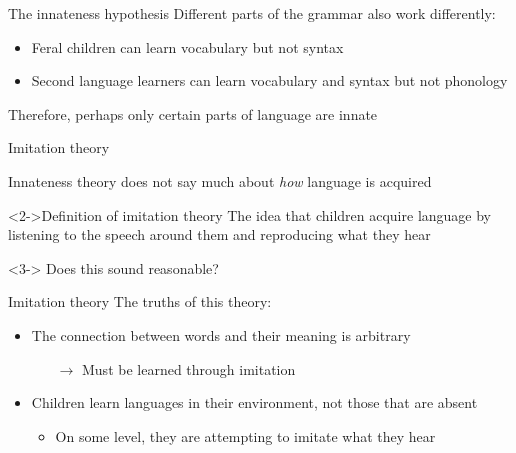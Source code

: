 \documentclass{beamer}
\begin{document}
        \begin{frame}{The innateness hypothesis}
            Different parts of the grammar also work differently:
            \begin{itemize}
                \item Feral children can learn vocabulary but not syntax
                \item Second language learners can learn vocabulary and syntax but not phonology
            \end{itemize}
            \begin{alertblock}{}
                Therefore, perhaps only certain parts of language are innate
            \end{alertblock}
        \end{frame}
        \begin{frame}{Imitation theory}
            \begin{alertblock}{}
                Innateness theory does not say much about \emph{how} language is acquired
            \end{alertblock}
            \begin{block}<2->{Definition of \alert{imitation theory}}
                The idea that children acquire language by listening to the speech around them and reproducing what they hear
            \end{block}
            \begin{alertblock}<3->{}
                Does this sound reasonable?
            \end{alertblock}
        \end{frame}
        \begin{frame}{Imitation theory}
            The truths of this theory:
            \begin{itemize}
                \item The connection between words and their meaning is arbitrary
                \begin{itemize}
                    \item[$\rightarrow$] Must be learned through imitation
                \end{itemize}
                \item<2-> Children learn languages in their environment, not those that are absent
                \begin{itemize}
                    \item<2->[$\rightarrow$] On some level, they are attempting to imitate what they hear
                \end{itemize}
            \end{itemize}
        \end{frame}
\end{document}
